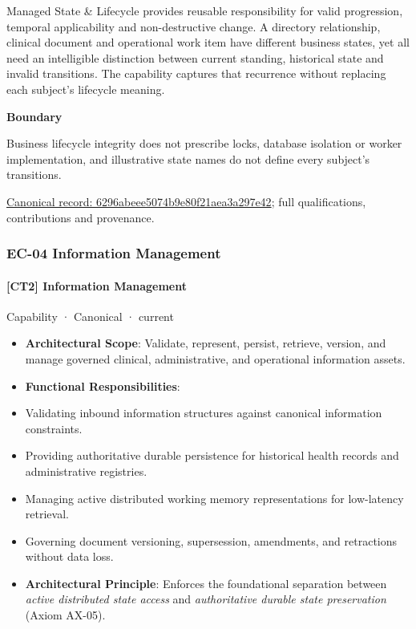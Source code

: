 Managed State \& Lifecycle provides reusable responsibility for valid progression, temporal applicability and non-destructive change. A directory relationship, clinical document and operational work item have different business states, yet all need an intelligible distinction between current standing, historical state and invalid transitions. The capability captures that recurrence without replacing each subject's lifecycle meaning.



\textbf{Boundary}



Business lifecycle integrity does not prescribe locks, database isolation or worker implementation, and illustrative state names do not define every subject's transitions.


{\footnotesize \href{../../../../continuum/strategy/capability/6296abeee5074b9e80f21aea3a297e42.md}{Canonical record: 6296abeee5074b9e80f21aea3a297e42}; full qualifications, contributions and provenance.}\par
\subsubsection{EC-04 Information Management}

\paragraph{[CT2] Information Management}

\label{element:43051efd406b4040bff8e794b7a631e0}
{\small Capability · Canonical · current}\par

\begin{itemize}


\item \textbf{Architectural Scope}: Validate, represent, persist, retrieve, version, and manage governed clinical, administrative, and operational information assets.

\item \textbf{Functional Responsibilities}:

\item Validating inbound information structures against canonical information constraints.

\item Providing authoritative durable persistence for historical health records and administrative registries.

\item Managing active distributed working memory representations for low-latency retrieval.

\item Governing document versioning, supersession, amendments, and retractions without data loss.

\item \textbf{Architectural Principle}: Enforces the foundational separation between \emph{active distributed state access} and \emph{authoritative durable state preservation} (Axiom AX-05).

\end{itemize}


